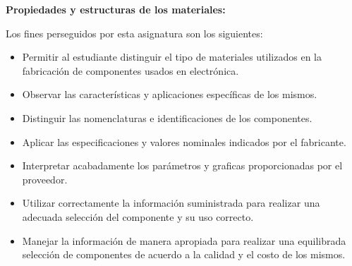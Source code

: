 \documentclass[12pt]{article}
\begin{document}
\par


\vspace{\baselineskip}

\vspace{\baselineskip}

\vspace{\baselineskip}
\textbf{Propiedades y estructuras de los materiales: }\par

Los fines perseguidos por esta asignatura son los siguientes: \par

\begin{itemize}
	\item Permitir al estudiante distinguir el tipo de materiales utilizados en la fabricación de componentes usados en electrónica.\par

	\item Observar las características y aplicaciones específicas de los mismos.\par

	\item Distinguir las nomenclaturas e identificaciones de los componentes.\par

	\item Aplicar las especificaciones y valores nominales indicados por el fabricante. \par

	\item Interpretar acabadamente los parámetros y graficas proporcionadas por el proveedor.\par

	\item Utilizar correctamente la información suministrada para realizar una adecuada selección del componente y su uso correcto. \par

	\item Manejar la información de manera apropiada para realizar una equilibrada selección de componentes de acuerdo a la calidad y el costo de los mismos.
\end{itemize}\par


\vspace{\baselineskip}
\end{document}
